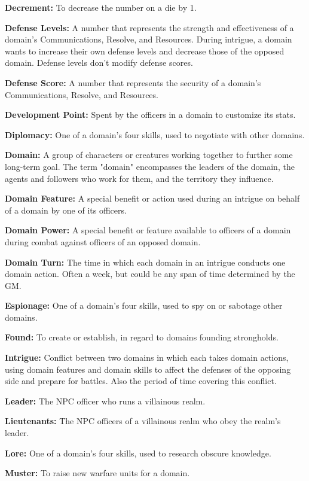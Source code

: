 \documentclass[10pt,a4paper,twoside,bg=print,twocolumn,openany,nodeprecatedcode]{dndbook}
\begin{document}
\textbf{Decrement:} To decrease the number on a die by 1.

\textbf{Defense Levels:} A number that represents the strength and effectiveness of a domain's Communications, Resolve, and Resources. During intrigue, a domain wants to increase their own defense levels and decrease those of the opposed domain. Defense levels don't modify defense scores.

\textbf{Defense Score:} A number that represents the security of a domain's Communications, Resolve, and Resources.

\textbf{Development Point:} Spent by the officers in a domain to customize its stats.

\textbf{Diplomacy:} One of a domain's four skills, used to negotiate with other domains.

\textbf{Domain:} A group of characters or creatures working together to further some long-term goal. The term "domain" encompasses the leaders of the domain, the agents and followers who work for them, and the territory they influence.

\textbf{Domain Feature:} A special benefit or action used during an intrigue on behalf of a domain by one of its officers.

\textbf{Domain Power:} A special benefit or feature available to officers of a domain during combat against officers of an opposed domain.

\textbf{Domain Turn:} The time in which each domain in an intrigue conducts one domain action. Often a week, but could be any span of time determined by the GM.

\textbf{Espionage:} One of a domain's four skills, used to spy on or sabotage other domains.

\textbf{Found:} To create or establish, in regard to domains founding strongholds.

\textbf{Intrigue:} Conflict between two domains in which each takes domain actions, using domain features and domain skills to affect the defenses of the opposing side and prepare for battles. Also the period of time covering this conflict.

\textbf{Leader:} The NPC officer who runs a villainous realm.

\textbf{Lieutenants:} The NPC officers of a villainous realm who obey the realm's leader.

\textbf{Lore:} One of a domain's four skills, used to research obscure knowledge.

\textbf{Muster:} To raise new warfare units for a domain.
\end{document}
